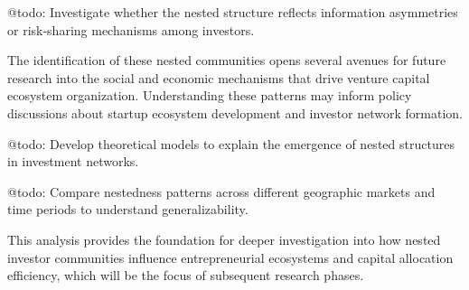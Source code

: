 \documentclass[12pt]{article}
\begin{document}
@todo: Investigate whether the nested structure reflects information asymmetries or risk-sharing mechanisms among investors.

The identification of these nested communities opens several avenues for future research into the social and economic mechanisms that drive venture capital ecosystem organization. Understanding these patterns may inform policy discussions about startup ecosystem development and investor network formation.

@todo: Develop theoretical models to explain the emergence of nested structures in investment networks.

@todo: Compare nestedness patterns across different geographic markets and time periods to understand generalizability.

This analysis provides the foundation for deeper investigation into how nested investor communities influence entrepreneurial ecosystems and capital allocation efficiency, which will be the focus of subsequent research phases.



\end{document}
